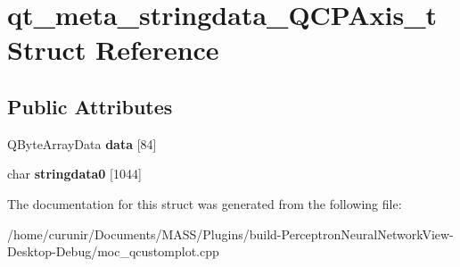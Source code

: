 \hypertarget{structqt__meta__stringdata___q_c_p_axis__t}{}\section{qt\+\_\+meta\+\_\+stringdata\+\_\+\+Q\+C\+P\+Axis\+\_\+t Struct Reference}
\label{structqt__meta__stringdata___q_c_p_axis__t}
\subsection*{Public Attributes}
\begin{DoxyCompactItemize}
\item 
Q\+Byte\+Array\+Data {\bfseries data} \mbox{[}84\mbox{]}\hypertarget{structqt__meta__stringdata___q_c_p_axis__t_ad6e7d43321d1d29667d8a964e8b94b03}{}\label{structqt__meta__stringdata___q_c_p_axis__t_ad6e7d43321d1d29667d8a964e8b94b03}

\item 
char {\bfseries stringdata0} \mbox{[}1044\mbox{]}\hypertarget{structqt__meta__stringdata___q_c_p_axis__t_a69e367a936d5d819080b35c76fe96c11}{}\label{structqt__meta__stringdata___q_c_p_axis__t_a69e367a936d5d819080b35c76fe96c11}

\end{DoxyCompactItemize}


The documentation for this struct was generated from the following file\+:\begin{DoxyCompactItemize}
\item 
/home/curunir/\+Documents/\+M\+A\+S\+S/\+Plugins/build-\/\+Perceptron\+Neural\+Network\+View-\/\+Desktop-\/\+Debug/moc\+\_\+qcustomplot.\+cpp\end{DoxyCompactItemize}
